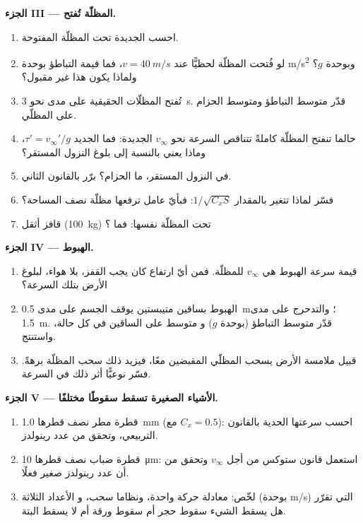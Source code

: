 \begin{problem}
\medskip
\noindent\textbf{الجزء III --- المظلّة تُفتح.}
\begin{enumerate}[resume]
  \item احسب  الجديدة تحت المظلّة المفتوحة.
  \item لو فُتحت المظلّة لحظيًّا عند $v = \qty{40}{m/s}$، فما
        قيمة التباطؤ بوحدة \unit{m/s^2} وبوحدة $g$؟ ولماذا يكون
        هذا غير مقبول؟
  \item تُفتح المظلّات الحقيقية على مدى نحو \qty{3}{s}. قدّر متوسط
        التباطؤ ومتوسط  الحزام على
        المظلّي.
  \item حالما تنفتح المظلّة كاملةً تتناقص السرعة نحو
        $v_\infty$ الجديدة: فما  الجديد $\tau' = v_\infty'/g$،
        وماذا يعني بالنسبة إلى بلوغ النزول المستقر؟
  \item في النزول المستقر، ما  الحزام؟ برّر بالقانون
        الثاني.
  \item فسّر لماذا تتغير  بالمقدار $1/\sqrt{C_xS}$: فبأيّ
        عامل ترفعها مظلّة نصف المساحة؟
  \item قافز أثقل (\qty{100}{kg}) تحت المظلّة نفسها: فما ؟
\end{enumerate}

\medskip
\noindent\textbf{الجزء IV --- الهبوط.}
\begin{enumerate}[resume]
  \item قيمة سرعة الهبوط هي $v_\infty$ للمظلّة. فمن أيّ ارتفاع
        كان يجب القفز، بلا هواء، لبلوغ الأرض بتلك
        السرعة؟
  \item الهبوط بساقين متيبستين يوقف الجسم على مدى \qty{0.5}{m}؛ والتدحرج
        على مدى \qty{1.5}{m}. قدّر متوسط التباطؤ (بوحدة $g$) و
        متوسط  على الساقين في كل حالة، واستنتج.
  \item قبيل ملامسة الأرض يسحب المظلّي المقبضين معًا،
        فيزيد ذلك سحب المظلّة برهةً. فسّر نوعيًّا
        أثر ذلك في السرعة.
\end{enumerate}

\medskip
\noindent\textbf{الجزء V --- الأشياء الصغيرة تسقط سقوطًا مختلفًا.}
\begin{enumerate}[resume]
  \item قطرة مطر نصف قطرها \qty{1.0}{mm} (مع $C_x = 0.5$): احسب
        سرعتها الحدية بالقانون التربيعي، وتحقق من عدد
        رينولدز.
  \item قطرة ضباب نصف قطرها \qty{10}{\micro m}: استعمل قانون ستوكس
        من أجل $v_\infty$ وتحقق من أن عدد رينولدز صغير
        فعلًا.
  \item لخّص: معادلة حركة واحدة، ونظاما سحب، و
        الأعداد الثلاثة (بوحدة \unit{m/s}) التي تقرّر هل يسقط الشيء
        سقوط حجر أم سقوط ورقة أم لا يسقط البتة.
\end{enumerate}
\end{problem}
